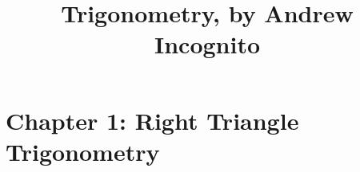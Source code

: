 \documentclass[12pt,handout,twocolumn,twoside,wordchoicegiven]{xourse}
\title{Trigonometry, by Andrew Incognito}
\begin{document}
\maketitle

\setcounter{tocdepth}{2}


\part{Chapter 1: Right Triangle Trigonometry}





\end{document}
